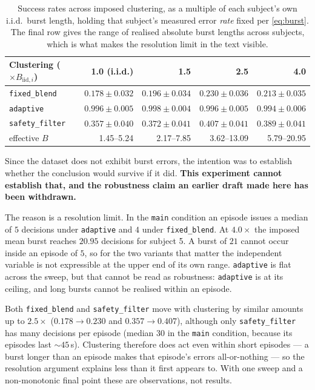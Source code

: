 \documentclass[11pt,a4paper]{article}
\newcommand{\vfixed}{\texttt{fixed\_blend}}
\newcommand{\vadapt}{\texttt{adaptive}}
\newcommand{\vsafety}{\texttt{safety\_filter}}
\theoremstyle{plain}
\theoremstyle{definition}
\begin{document}
\begin{table}[htbp]
\centering
\small
\begin{tabular}{@{}lrrrr@{}}
\toprule
Clustering ($\times B_{\mathrm{iid},i}$) & 1.0 (i.i.d.) & 1.5 & 2.5 & 4.0 \\
\midrule
\vfixed  & $0.178 \pm 0.032$ & $0.196 \pm 0.034$ & $0.230 \pm 0.036$ & $0.213 \pm 0.035$ \\
\vadapt  & $0.996 \pm 0.005$ & $0.998 \pm 0.004$ & $0.996 \pm 0.005$ & $0.994 \pm 0.006$ \\
\vsafety & $0.357 \pm 0.040$ & $0.372 \pm 0.041$ & $0.407 \pm 0.041$ & $0.389 \pm 0.041$ \\
\midrule
effective $B$ & 1.45--5.24 & 2.17--7.85 & 3.62--13.09 & 5.79--20.95 \\
\bottomrule
\end{tabular}
\caption{Success rates across imposed clustering, as a multiple of each
subject's own i.i.d.\ burst length, holding that subject's measured error
\emph{rate} fixed per \eqref{eq:burst}. The final row gives the range of
realised absolute burst lengths across subjects, which is what makes the
resolution limit in the text visible.}
\label{tab:burst}
\end{table}

Since the dataset does not exhibit burst errors, the intention was to
establish whether the conclusion would survive if it did. \textbf{This
experiment cannot establish that, and the robustness claim an earlier
draft made here has been withdrawn.}

The reason is a resolution limit. In the \texttt{main} condition an
episode issues a median of $5$ decisions under \vadapt{} and $4$ under
\vfixed{}. At $4.0\times$ the
imposed mean burst reaches $20.95$ decisions for subject 5. A burst of
$21$ cannot occur inside an episode of $5$, so for the two variants that
matter the independent variable is not expressible at the upper end of
its own range. \vadapt{} is flat across the sweep, but that cannot be
read as robustness: \vadapt{} is at its ceiling, and long bursts cannot
be realised within an episode.

Both \vfixed{} and \vsafety{} move with clustering by similar amounts up
to $2.5\times$ ($0.178 \to 0.230$ and $0.357 \to 0.407$), although only
\vsafety{} has many decisions per episode (median $30$ in the
\texttt{main} condition, because its episodes last ${\sim}45$\,s).
Clustering therefore does act even within short episodes --- a burst
longer than an episode makes that episode's errors all-or-nothing ---
so the resolution argument explains less than it first appears to. With
one sweep and a non-monotonic final point these are observations, not
results.
\end{document}
